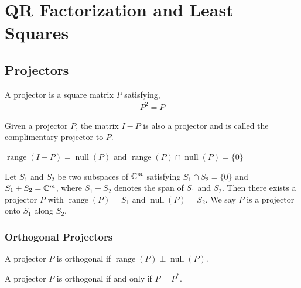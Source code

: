 \documentclass[12pt]{article}
\begin{document}
\section{QR Factorization and Least Squares}

\subsection{Projectors}

\begin{definition}[Projector]
A projector is a square matrix \( P \) satisfying,
\begin{align*}
    P^2 = P
\end{align*}
\end{definition}

\begin{definition}
Given a projector \( P \), the matrix \( I-P \) is also a projector and is called the complimentary projector to \( P \).
\end{definition}

\begin{theorem}
\( \operatorname{range}(I-P) = \operatorname{null}(P) \) and \( \operatorname{range}(P) \cap \operatorname{null}(P) = \{ 0 \} \)
\end{theorem}

\begin{theorem}
Let \( S_1 \) and \( S_2 \) be two subspaces of \( \mathbb{C}^m \) satisfying \( S_1\cap S_2 = \{ 0 \} \) and \( S_1 + S_2 = \mathbb{C}^m \), where \( S_1+S_2 \) denotes the span of \( S_1 \) and \( S_2 \). Then there exists a projector \( P \) with \( \operatorname{range}(P) = S_1 \) and \( \operatorname{null}(P) = S_2 \). We say \( P \) is a projector onto \( S_1 \) along \( S_2 \).
\end{theorem}

\subsubsection{Orthogonal Projectors}

\begin{definition}
A projector \( P \) is orthogonal if \( \operatorname{range}(P) \perp \operatorname{null}(P) \).
\end{definition}

\begin{theorem}
A projector \( P \) is orthogonal if and only if \( P = P^* \).
\end{theorem}
\end{document}
